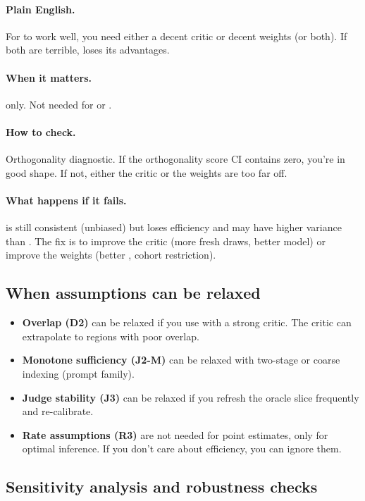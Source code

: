\paragraph{Plain English.} For \dr{} to work well, you need either a decent critic or decent weights (or both). If both are terrible, \dr{} loses its advantages.

\paragraph{When it matters.} \dr{} only. Not needed for \dm{} or \ips.

\paragraph{How to check.} Orthogonality diagnostic. If the orthogonality score CI contains zero, you're in good shape. If not, either the critic or the weights are too far off.

\paragraph{What happens if it fails.} \dr{} is still consistent (unbiased) but loses efficiency and may have higher variance than \ips. The fix is to improve the critic (more fresh draws, better model) or improve the weights (better \simcal, cohort restriction).

\subsection{When assumptions can be relaxed}

\begin{itemize}
\item \textbf{Overlap (D2)} can be relaxed if you use \dr{} with a strong critic. The critic can extrapolate to regions with poor overlap.
\item \textbf{Monotone sufficiency (J2-M)} can be relaxed with two-stage \autocal{} or coarse indexing (prompt family).
\item \textbf{Judge stability (J3)} can be relaxed if you refresh the oracle slice frequently and re-calibrate.
\item \textbf{Rate assumptions (R3)} are not needed for point estimates, only for optimal inference. If you don't care about efficiency, you can ignore them.
\end{itemize}

\subsection{Sensitivity analysis and robustness checks}

